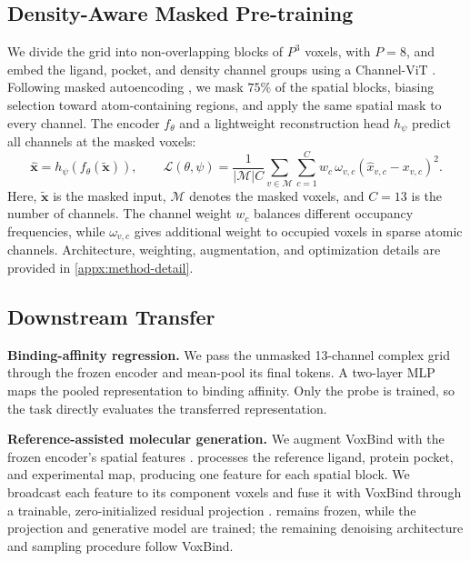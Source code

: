\subsection{Density-Aware Masked Pre-training}

We divide the grid into non-overlapping blocks of $P^3$ voxels, with $P=8$, and
embed the ligand, pocket, and density channel groups using a Channel-ViT
\citep{bao2023channel-24a}. Following masked autoencoding
\citep{he2022masked}, we mask $75\%$ of the spatial blocks, biasing selection
toward atom-containing regions, and apply the same spatial mask to every
channel. The encoder $f_\theta$ and a lightweight reconstruction head $h_\psi$
predict all channels at the masked voxels:
\begin{equation}
\widehat{\mathbf x}=h_\psi\!\left(f_\theta(\widetilde{\mathbf x})\right),
\qquad
\mathcal L(\theta,\psi)=
\frac{1}{|\mathcal M|C}
\sum_{v\in\mathcal M}\sum_{c=1}^{C}
w_c\,\omega_{v,c}
\left(\widehat{x}_{v,c}-x_{v,c}\right)^2.
\label{eq:masked-pretraining}
\end{equation}
Here, $\widetilde{\mathbf x}$ is the masked input, $\mathcal M$ denotes the
masked voxels, and $C=13$ is the number of channels. The channel weight $w_c$
balances different occupancy frequencies, while $\omega_{v,c}$ gives additional
weight to occupied voxels in sparse atomic channels. Architecture, weighting,
augmentation, and optimization details are provided in
\cref{appx:method-detail}.

\subsection{Downstream Transfer}

\textbf{Binding-affinity regression.}
We pass the unmasked 13-channel complex grid through the frozen encoder and
mean-pool its final tokens. A two-layer MLP maps the pooled representation to
binding affinity. Only the probe is trained, so the task directly evaluates the
transferred representation.

\textbf{Reference-assisted molecular generation.}
We augment VoxBind with the frozen encoder's spatial features
\citep{pinheiro2024structure}. \ours{} processes the reference ligand, protein
pocket, and experimental map, producing one feature for each spatial block. We
broadcast each feature to its component voxels and fuse it with VoxBind through
a trainable, zero-initialized residual projection \citep{zhang2023adding}.
\ours{} remains frozen, while the projection and generative model are trained;
the remaining denoising architecture and sampling procedure follow VoxBind.
